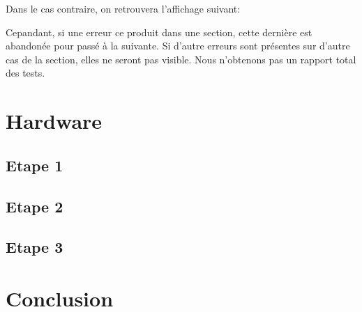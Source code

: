 \documentclass[a4paper]{article}
\begin{document}

        Dans le cas contraire, on retrouvera l'affichage suivant:

        Cepandant, si une erreur ce produit dans une section, cette dernière est abandonée pour passé à la suivante.
        Si d'autre erreurs sont présentes sur d'autre cas de la section, elles ne seront pas visible. Nous n'obtenons pas un rapport total des tests.
\section{Hardware}
    \subsection{Etape 1}
    \subsection{Etape 2}
    \subsection{Etape 3}

\section{Conclusion} %
\begin{lstlisting}[style=CStyle]
    
\end{lstlisting}

\newpage %
\listoftodos
\end{document}
